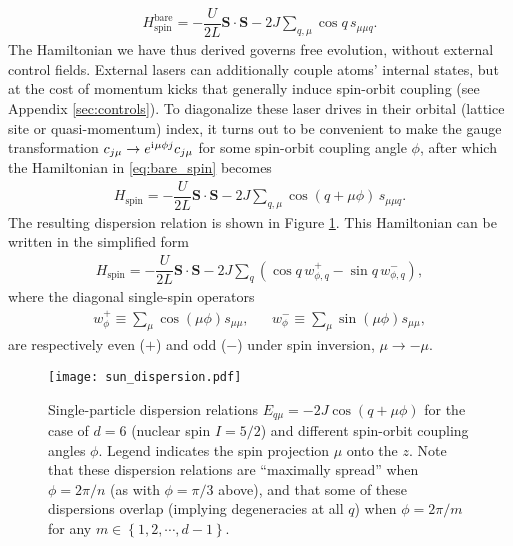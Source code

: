\documentclass[nofootinbib,notitlepage,11pt]{revtex4-2}
\renewcommand{\t}{\text} %
\newcommand{\f}[2]{\dfrac{#1}{#2}} %
\newcommand{\p}[1]{\left(#1\right)} %
\renewcommand{\set}[1]{\left\{#1\right\}} %
\renewcommand{\v}{\bm} %
\renewcommand{\c}{\cdot} %
\renewcommand{\i}{\mathrm{i}\mkern1mu} %
\newcommand{\1}{\mathds{1}}
\begin{document}
\begin{align}
  H_{\t{spin}}^{\t{bare}}
  = -\f{U}{2L} \v S \c\v S - 2J \sum_{q,\mu} \cos q\, s_{\mu\mu q}.
  \label{eq:bare_spin}
\end{align}
The Hamiltonian we have thus derived governs free evolution, without external control fields.
External lasers can additionally couple atoms' internal states, but at the cost of momentum kicks that generally induce spin-orbit coupling (see Appendix \ref{sec:controls}).
To diagonalize these laser drives in their orbital (lattice site or quasi-momentum) index, it turns out to be convenient to make the gauge transformation $c_{j\mu}\to e^{\i\mu\phi j} c_{j\mu}$ for some spin-orbit coupling angle $\phi$, after which the Hamiltonian in \eqref{eq:bare_spin} becomes
\begin{align}
  H_{\t{spin}} = -\f{U}{2L} \v S \c\v S
  - 2J \sum_{q,\mu} \cos\p{q+\mu\phi}\, s_{\mu\mu q}.
  \label{eq:spin_cos}
\end{align}
The resulting dispersion relation is shown in Figure \ref{fig:disps}.
This Hamiltonian can be written in the simplified form
\begin{align}
  H_{\t{spin}} = -\f{U}{2L} \v S\c\v S
  - 2J \sum_q \p{\cos q\, w_{\phi,q}^+ - \sin q\, w_{\phi,q}^-},
  \label{eq:spin_pair}
\end{align}
where the diagonal single-spin operators
\begin{align}
  w_\phi^+ \equiv \sum_\mu \cos\p{\mu\phi} s_{\mu\mu},
  &&
  w_\phi^- \equiv \sum_\mu \sin\p{\mu\phi} s_{\mu\mu},
\end{align}
are respectively even ($+$) and odd ($-$) under spin inversion, $\mu\to-\mu$.

\begin{figure}
  \centering
  \texttt{[image: sun\_dispersion.pdf]}
  \caption{Single-particle dispersion relations $E_{q\mu}=-2J\cos\p{q+\mu\phi}$ for the case of $d=6$ (nuclear spin $I=5/2$) and different spin-orbit coupling angles $\phi$.
    Legend indicates the spin projection $\mu$ onto the $z$.
    Note that these dispersion relations are ``maximally spread'' when $\phi=2\pi/n$ (as with $\phi=\pi/3$ above), and that some of these dispersions overlap (implying degeneracies at all $q$) when $\phi=2\pi/m$ for any $m\in\set{1,2,\cdots,d-1}$.}
  \label{fig:disps}
\end{figure}
\end{document}
